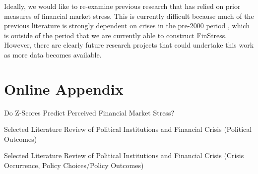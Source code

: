 \documentclass[]{article}
\begin{document}
Ideally, we would like to re-examine previous research that has relied on prior measures of financial market stress. This is currently difficult because much of the previous literature is strongly dependent on crises in the pre-2000 period \citep[see][]{GandrudHallerberg2015}, which is outside of the period that we are currently able to construct FinStress. However, there are clearly future research projects that could undertake this work as more data becomes available.




\clearpage

\section*{Online Appendix}


\begin{table}
    \caption{Do Z-Scores Predict Perceived Financial Market Stress?}
    \label{epfms_z_regress}

    \begin{center}
        
    \end{center}
\end{table}


\begin{table}[H]
\caption{Selected Literature Review of Political Institutions and Financial
Crisis (Political Outcomes)}


\label{LitRevTable2}
\begin{center}

\vspace{0.5cm}
\scalebox{0.9}{

}
\end{center}
\end{table}

\begin{table}[H]
\caption{Selected Literature Review of Political Institutions and Financial
Crisis (Crisis Occurrence, Policy Choices/Policy Outcomes)}


\label{LitRevTable}
\begin{center}

\vspace{0.5cm}
{\tiny{

}}
\end{center}
\end{table}
\end{document}
